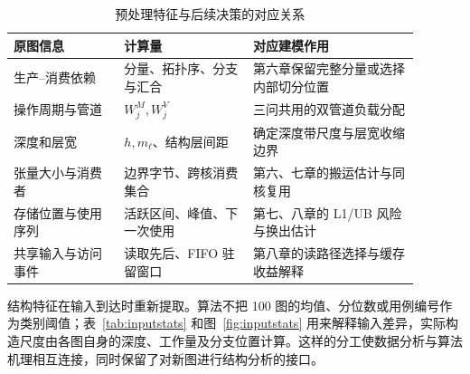 \begin{table}[htbp]
\centering
\caption{预处理特征与后续决策的对应关系}
\label{tab:featureuse}
\begin{tabular}{p{0.24\linewidth}p{0.29\linewidth}p{0.36\linewidth}}
\hline
原图信息 & 计算量 & 对应建模作用 \\
\hline
生产--消费依赖 & 分量、拓扑序、分支与汇合 & 第六章保留完整分量或选择内部切分位置 \\
操作周期与管道 & $W_j^M,W_j^V$ & 三问共用的双管道负载分配 \\
深度和层宽 & $h,m_\ell$、结构层间距 & 确定深度带尺度与层宽收缩边界 \\
张量大小与消费者 & 边界字节、跨核消费集合 & 第六、七章的搬运估计与同核复用 \\
存储位置与使用序列 & 活跃区间、峰值、下一次使用 & 第七、八章的 L1/UB 风险与换出估计 \\
共享输入与访问事件 & 读取先后、FIFO 驻留窗口 & 第八章的读路径选择与缓存收益解释 \\
\hline
\end{tabular}
\end{table}

结构特征在输入到达时重新提取。算法不把 100 图的均值、分位数或用例编号作为类别阈值；表~\ref{tab:inputstats} 和图~\ref{fig:inputstats} 用来解释输入差异，实际构造尺度由各图自身的深度、工作量及分支位置计算。这样的分工使数据分析与算法机理相互连接，同时保留了对新图进行结构分析的接口。
